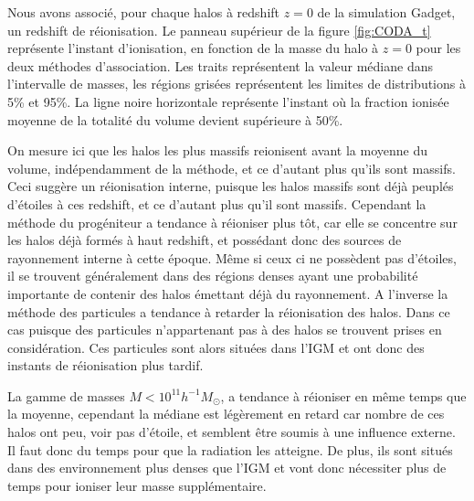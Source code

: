 Nous avons associé, pour chaque halos à redshift $z=0$ de la simulation Gadget, un redshift de réionisation.
Le panneau supérieur de la figure \ref{fig:CODA_t} représente l'instant d'ionisation, en fonction de la masse du halo à $z=0$ pour les deux méthodes d'association.
Les traits représentent la valeur médiane dans l'intervalle de masses, les régions grisées représentent les limites de distributions à 5\% et 95\%.
La ligne noire horizontale représente l'instant où la fraction ionisée moyenne de la totalité du volume devient supérieure à 50\%.

On mesure ici que les halos les plus massifs reionisent avant la moyenne du volume, indépendamment de la méthode, et ce d'autant plus qu'ils sont massifs.
Ceci suggère un réionisation interne, puisque les halos massifs sont déjà peuplés d'étoiles à ces redshift, et ce d'autant plus qu'il sont massifs.
Cependant la méthode du progéniteur a tendance à réioniser plus tôt, car elle se concentre sur les halos déjà formés à haut redshift, et possédant donc des sources de rayonnement interne à cette époque.
Même si ceux ci ne possèdent pas d'étoiles, il se trouvent généralement dans des régions denses ayant une probabilité importante de contenir des halos émettant déjà du rayonnement.
A l'inverse la méthode des particules a tendance à retarder la réionisation des halos. 
Dans ce cas puisque des particules n'appartenant pas à des halos se trouvent prises en considération.
Ces particules sont alors situées dans l'\ac{IGM} et ont donc des instants de réionisation plus tardif.

La gamme de masses $M <10^{11} h^{-1}M_\odot$, a tendance à réioniser en même temps que la moyenne, cependant la médiane est légèrement en retard car nombre de ces halos ont peu, voir pas d'étoile, et semblent être soumis à une influence externe.
Il faut donc du temps pour que la radiation les atteigne.
De plus, ils sont situés dans des environnement plus denses que l'\ac{IGM} et vont donc nécessiter plus de temps pour ioniser leur masse supplémentaire.



